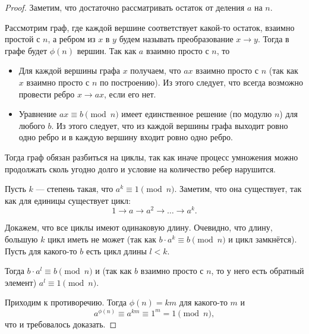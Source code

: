 \documentclass[a4paper]{article}
\theoremstyle{named}
\begin{document}
\begin{colloq}
        \begin{proof}
            Заметим, что достаточно рассматривать остаток от деления $a$ на $n$.

            Рассмотрим граф, где каждой вершине соответствует какой-то остаток, взаимно простой с $n$, а ребром из $x$ в $y$ будем называть преобразование $x \to y$. Тогда в графе будет $\phi(n)$ вершин. Так как $a$ взаимно просто с $n$, то
            \begin{itemize}
            \item
                Для каждой вершины графа $x$ получаем, что $ax$ взаимно просто с $n$ (так как $x$ взаимно просто с $n$ по построению). Из этого следует, что всегда возможно провести ребро $x \to ax$, если его нет.

            \item
                Уравнение $ax \equiv b \pmod n$ имеет единственное решение (по модулю $n$) для любого $b$. Из этого следует, что из каждой вершины графа выходит ровно одно ребро и в каждую вершину входит ровно одно ребро.
            \end{itemize}

            Тогда граф обязан разбиться на циклы, так как иначе процесс умножения можно продолжать сколь угодно долго и условие на количество ребер нарушится. 
            
            Пусть $k$ --- степень такая, что $a^k \equiv 1 \pmod n$. Заметим, что она существует, так как для единицы существует цикл:
            \begin{equation*}
                1 \to a \to a^2 \to \dots \to a^k.
            \end{equation*}

            Докажем, что все циклы имеют одинаковую длину. Очевидно, что длину, большую $k$ цикл иметь не может (так как $b \cdot a^k \equiv b \pmod n$ и цикл замкнётся). Пусть для какого-то $b$ есть цикл длины $l < k$.

            Тогда $b \cdot a^l \equiv b \pmod n$ и (так как $b$ взаимно просто с $n$, то у него есть обратный элемент) $a^l \equiv 1 \pmod n$.

            Приходим к противоречию. Тогда $\phi(n) = km$ для какого-то $m$ и
            \begin{equation*}
                a^{\phi(n)} \equiv a^{km} \equiv 1^m = 1 \pmod n,
            \end{equation*}
            что и требовалось доказать.
        \end{proof}


\end{colloq}
\end{document}
